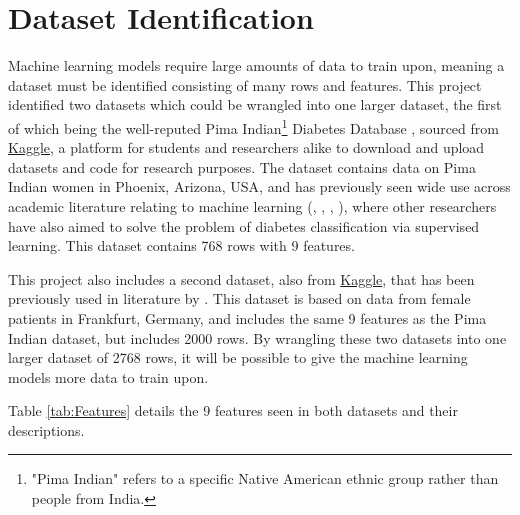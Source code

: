 \documentclass[12pt]{report}
\newcommand{\para}{\vspace{8pt}\noindent}
\begin{document}
\pagebreak 
\section{Dataset Identification}

Machine learning models require large amounts of data to train upon, meaning a dataset must be identified consisting of many 
rows and features. This project identified two datasets which could be wrangled into one larger dataset, the first of which being 
the well-reputed Pima Indian\footnote{"Pima Indian" refers to a specific Native American ethnic group rather than people from India.} 
Diabetes Database \autocite{uci_machine_learning_pima_nodate}, sourced from \href{https://www.kaggle.com/datasets/uciml/pima-indians-diabetes-database}{Kaggle}, 
a platform for students and researchers alike to download and upload datasets and code for research purposes. The dataset contains data on Pima Indian women in 
Phoenix, Arizona, USA, and has previously seen wide use across academic literature relating to machine learning (\textcite{alzubi_diabetes_2023}, \textcite{zou_construction_2024}, \textcite{joshi_predicting_2021}, \textcite{hayashi_rule_2016}),
where other researchers have also aimed to solve the problem of diabetes classification via supervised learning. This dataset contains 768 rows with 9 features.

\para
This project also includes a second dataset, also from \href{https://www.kaggle.com/datasets/johndasilva/diabetes/data}{Kaggle}, that has been previously used in literature by 
\textcite{zou_construction_2024}. This dataset \autocite{john_dasilva_frankfurt_nodate} is based on data from female patients in Frankfurt, Germany, and includes the same 9 features as the Pima Indian dataset, but includes 2000 rows. By wrangling these two datasets into one larger
dataset of 2768 rows, it will be possible to give the machine learning models more data to train upon.

\para Table \ref{tab:Features} details the 9 features seen in both datasets and their descriptions.
\end{document}
